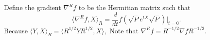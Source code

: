 \documentclass{article}
\newcommand\tr{\operatorname{Tr}}
\begin{document}
Define the gradient $\nabla^R f$ to be the Hermitian matrix such that 
$$ \langle \nabla^R f, X \rangle_R = \frac{d}{dt } f(\sqrt{P} e^{tX} \sqrt{P}) |_{t = 0}.$$ 
Because $\langle Y, X \rangle_R = \langle R^{1/2} YR^{1/2}, X \rangle,$
Note that $\nabla^R f = R^{-1/2} \nabla f R^{-1/2}$. 







\end{document}
